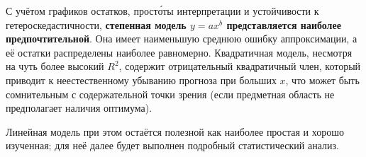 С учётом графиков остатков, просто́ты интерпретации и устойчивости к гетероскедастичности, \textbf{степенная модель \(y = a x^b\) представляется наиболее предпочтительной}. Она имеет наименьшую среднюю ошибку аппроксимации, а её остатки распределены наиболее равномерно. Квадратичная модель, несмотря на чуть более высокий \(R^2\), содержит отрицательный квадратичный член, который приводит к неестественному убыванию прогноза при больших \(x\), что может быть сомнительным с содержательной точки зрения (если предметная область не предполагает наличия оптимума).

Линейная модель при этом остаётся полезной как наиболее простая и хорошо изученная; для неё далее будет выполнен подробный статистический анализ.
